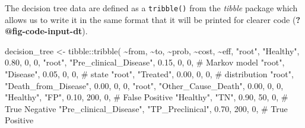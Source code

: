 \documentclass[
]{article}
\newenvironment{Shaded}{\begin{snugshade}}{\end{snugshade}}
\newcommand{\CommentTok}[1]{\textcolor[rgb]{0.37,0.37,0.37}{#1}}
\newcommand{\DecValTok}[1]{\textcolor[rgb]{0.68,0.00,0.00}{#1}}
\newcommand{\FloatTok}[1]{\textcolor[rgb]{0.68,0.00,0.00}{#1}}
\newcommand{\FunctionTok}[1]{\textcolor[rgb]{0.28,0.35,0.67}{#1}}
\newcommand{\NormalTok}[1]{\textcolor[rgb]{0.00,0.23,0.31}{#1}}
\newcommand{\OtherTok}[1]{\textcolor[rgb]{0.00,0.23,0.31}{#1}}
\newcommand{\SpecialCharTok}[1]{\textcolor[rgb]{0.37,0.37,0.37}{#1}}
\newcommand{\StringTok}[1]{\textcolor[rgb]{0.13,0.47,0.30}{#1}}
\begin{document}
The decision tree data are defined as a \texttt{tribble()} from the
\emph{tibble} package which allows us to write it in the same format
that it will be printed for clearer code (\textbf{?@fig-code-input-dt}).

\begin{Shaded}
\begin{Highlighting}[]
\NormalTok{decision\_tree }\OtherTok{\textless{}{-}}\NormalTok{ tibble}\SpecialCharTok{::}\FunctionTok{tribble}\NormalTok{(}
  \SpecialCharTok{\textasciitilde{}}\NormalTok{from,                  }\SpecialCharTok{\textasciitilde{}}\NormalTok{to,                    }\SpecialCharTok{\textasciitilde{}}\NormalTok{prob, }\SpecialCharTok{\textasciitilde{}}\NormalTok{cost, }\SpecialCharTok{\textasciitilde{}}\NormalTok{eff,}
  \StringTok{"root"}\NormalTok{,                 }\StringTok{"Healthy"}\NormalTok{,              }\FloatTok{0.80}\NormalTok{,      }\DecValTok{0}\NormalTok{,    }\DecValTok{0}\NormalTok{,}
  \StringTok{"root"}\NormalTok{,                 }\StringTok{"Pre\_clinical\_Disease"}\NormalTok{, }\FloatTok{0.15}\NormalTok{,      }\DecValTok{0}\NormalTok{,    }\DecValTok{0}\NormalTok{,  }\CommentTok{\# Markov model}
  \StringTok{"root"}\NormalTok{,                 }\StringTok{"Disease"}\NormalTok{,              }\FloatTok{0.05}\NormalTok{,      }\DecValTok{0}\NormalTok{,    }\DecValTok{0}\NormalTok{,  }\CommentTok{\# state }
  \StringTok{"root"}\NormalTok{,                 }\StringTok{"Treated"}\NormalTok{,              }\FloatTok{0.00}\NormalTok{,      }\DecValTok{0}\NormalTok{,    }\DecValTok{0}\NormalTok{,  }\CommentTok{\# distribution}
  \StringTok{"root"}\NormalTok{,                 }\StringTok{"Death\_from\_Disease"}\NormalTok{,   }\FloatTok{0.00}\NormalTok{,      }\DecValTok{0}\NormalTok{,    }\DecValTok{0}\NormalTok{,  }
  \StringTok{"root"}\NormalTok{,                 }\StringTok{"Other\_Cause\_Death"}\NormalTok{,    }\FloatTok{0.00}\NormalTok{,      }\DecValTok{0}\NormalTok{,    }\DecValTok{0}\NormalTok{,}
  \StringTok{"Healthy"}\NormalTok{,              }\StringTok{"FP"}\NormalTok{,                   }\FloatTok{0.10}\NormalTok{,    }\DecValTok{200}\NormalTok{,    }\DecValTok{0}\NormalTok{,  }\CommentTok{\# False Positive}
  \StringTok{"Healthy"}\NormalTok{,              }\StringTok{"TN"}\NormalTok{,                   }\FloatTok{0.90}\NormalTok{,     }\DecValTok{50}\NormalTok{,    }\DecValTok{0}\NormalTok{,  }\CommentTok{\# True Negative}
  \StringTok{"Pre\_clinical\_Disease"}\NormalTok{, }\StringTok{"TP\_Preclinical"}\NormalTok{,       }\FloatTok{0.70}\NormalTok{,    }\DecValTok{200}\NormalTok{,    }\DecValTok{0}\NormalTok{,  }\CommentTok{\# True Positive}

\end{Highlighting}
\end{Shaded}
\end{document}
